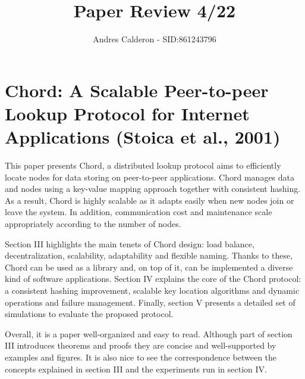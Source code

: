 \documentclass[a4paper,10pt]{scrartcl}
\title{Paper Review 4/22}
\author{Andres Calderon - SID:861243796}
\begin{document}
\maketitle
\thispagestyle{empty}

\section*{Chord: A Scalable Peer-to-peer Lookup Protocol for Internet Applications (Stoica et al., 2001)}
This paper presents Chord, a distributed lookup protocol aims to efficiently locate nodes for data storing on peer-to-peer applications.  Chord manages data and nodes using a key-value mapping approach together with consistent hashing.  As a result, Chord is highly scalable as it adapts easily when new nodes join or leave the system.  In addition, communication cost and maintenance scale appropriately according to the number of nodes.

Section III highlights the main tenets of Chord design: load balance, decentralization, scalability, adaptability and flexible naming.  Thanks to these, Chord can be used as a library and, on top of it, can be implemented a diverse kind of software applications.  Section IV explains the core of the Chord protocol: a consistent hashing improvement, scalable key location algorithms and dynamic operations and failure management.  Finally, section V presents a detailed set of simulations to evaluate the proposed protocol.

Overall, it is a paper well-organized and easy to read.  Although part of section III introduces theorems and proofs they are concise and well-supported by examples and figures.  It is also nice to see the correspondence between the concepts explained in section III and the experiments run in section IV.

\end{document}
